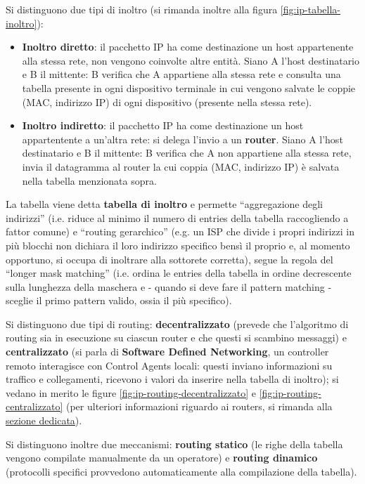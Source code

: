\documentclass[11pt, italian, openany]{book}
\begin{document}
\begin{sloppypar}
Si distinguono due tipi di inoltro (si rimanda inoltre alla figura \ref{fig:ip-tabella-inoltro}):
\begin{itemize}[itemsep=0pt, parsep=0pt, topsep=0pt]
	\item \textbf{Inoltro diretto}: il pacchetto IP ha come destinazione un host appartenente alla stessa rete, non vengono coinvolte altre entit\`a. Siano
	A l'host destinatario e B il mittente: B verifica che A appartiene alla stessa rete e consulta una tabella presente in ogni dispositivo terminale
	in cui vengono salvate le coppie (MAC, indirizzo IP) di ogni dispositivo (presente nella stessa rete).
	\item \textbf{Inoltro indiretto}: il pacchetto IP ha come destinazione un host appartentente a un'altra rete: si delega l'invio a un \textbf{router}. Siano
	A l'host destinatario e B il mittente: B verifica che A non appartiene alla stessa rete, invia il datagramma al router la cui coppia (MAC, indirizzo IP)
	\`e salvata nella tabella menzionata sopra.
\end{itemize}
La tabella viene detta \textbf{tabella di inoltro} e permette ``aggregazione degli indirizzi'' (i.e. riduce al minimo il numero di entries della tabella
raccogliendo a fattor comune) e ``routing gerarchico'' (e.g. un ISP che divide i propri indirizzi in pi\`u blocchi non dichiara il loro indirizzo specifico
bens\`i il proprio e, al momento opportuno, si occupa di inoltrare alla sottorete corretta), segue la regola del ``longer mask matching'' (i.e. ordina le
entries della tabella in ordine decrescente sulla lunghezza della maschera e - quando si deve fare il pattern matching - sceglie il primo pattern valido,
ossia il pi\`u specifico).

Si distinguono due tipi di routing: \textbf{decentralizzato} (prevede che l'algoritmo di routing sia in esecuzione su ciascun router e che questi si scambino
messaggi) e \textbf{centralizzato} (si parla di \textbf{Software Defined Networking}, un controller remoto interagisce con Control Agents locali: questi
inviano informazioni su traffico e collegamenti, ricevono i valori da inserire nella tabella di inoltro); si vedano in merito le figure
\ref{fig:ip-routing-decentralizzato} e \ref{fig:ip-routing-centralizzato} (per ulteriori informazioni riguardo ai routers, si rimanda alla
\hyperref[Routers]{\underline{sezione dedicata}}).

Si distinguono inoltre due meccanismi: \textbf{routing statico} (le righe della tabella vengono compilate manualmente da un operatore) e
\textbf{routing dinamico} (protocolli specifici provvedono automaticamente alla compilazione della tabella).


\end{sloppypar}
\end{document}
